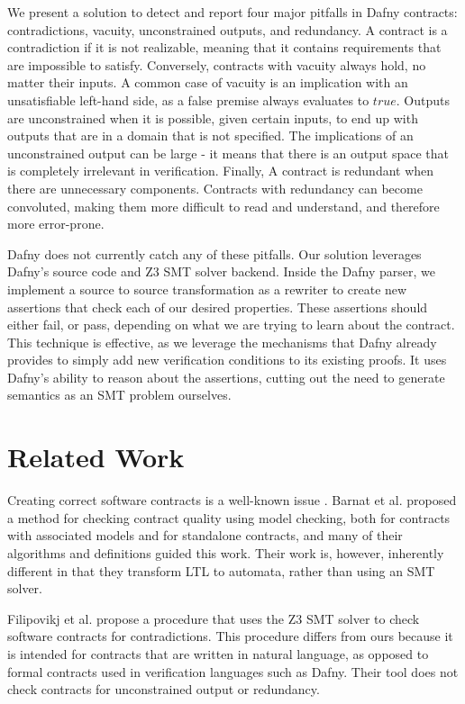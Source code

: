\documentclass[sigplan,screen,anonymous]{acmart}
\begin{document}
We present a solution to detect and report four major pitfalls in Dafny contracts: contradictions, vacuity, unconstrained outputs, and redundancy. A contract is a contradiction if it is not realizable, meaning that it contains requirements that are impossible to satisfy. Conversely, contracts with vacuity always hold, no matter their inputs. A common case of vacuity is an implication with an unsatisfiable left-hand side, as a false premise always evaluates to \(true\). Outputs are unconstrained when it is possible, given certain inputs, to end up with outputs that are in a domain that is not specified. The implications of an unconstrained output can be large - it means that there is an output space that is completely irrelevant in verification. Finally, A contract is redundant when there are unnecessary components. Contracts with redundancy can become convoluted, making them more difficult to read and understand, and therefore more
error-prone.

Dafny does not currently catch any of these pitfalls. Our solution leverages Dafny's source code and Z3 SMT solver \cite{de2008z3} backend. Inside the Dafny parser, we implement a source to source transformation as a rewriter to create new assertions that check each of our desired properties. These assertions should either fail, or pass, depending on what we are trying to learn about the contract. This technique is effective, as we leverage the mechanisms that Dafny already provides to simply add new verification conditions to its existing proofs. It uses Dafny's ability to reason about the assertions, cutting out the need to generate semantics as an SMT problem ourselves.

\section{Related Work}

Creating correct software contracts is a well-known issue \cite{rozier2016specification} \cite{kupferman2006sanity}. Barnat et al. \cite{barnat2012checking} \cite{barnat2016analysing} proposed a method for checking contract quality using model checking, both for contracts with associated models and for standalone contracts, and many of their algorithms and definitions guided this work. Their work is, however, inherently different in that they transform LTL to automata, rather than using an SMT solver.

Filipovikj et al. \cite{filipovikj2017smt} propose a procedure that uses the Z3 SMT solver to check software contracts for contradictions. This procedure differs from ours because it is intended for contracts that are written in natural language, as opposed to formal contracts used in verification languages such as Dafny. Their tool does not check contracts for unconstrained output or redundancy.
\end{document}
